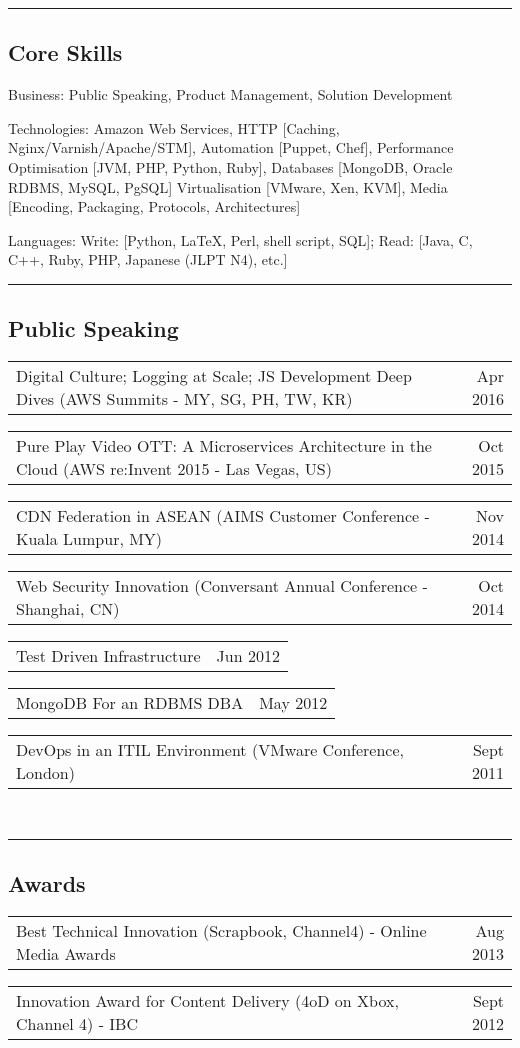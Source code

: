 \documentclass[10pt,a4paper]{article}
\makeatletter
\newenvironment{indentsection}[1]%
{\begin{list}{}%
    {\setlength{\leftmargin}{#1}}%
    \item[]%
}
{\end{list}}
\newcommand{\headerrow}[2]
{\begin{tabular*}{\linewidth}{l@{\extracolsep{\fill}}r}
    #1 &
    #2 \\
\end{tabular*}}
\makeatother
\begin{document}
\hrule
\vspace{-0.4em}
\subsection*{Core Skills}

\begin{indentsection}{\parindent}
\begin{description*}
    \item[Business:]
    Public Speaking, Product Management, Solution Development 
    \item[Technologies:]
    Amazon Web Services, HTTP [Caching, Nginx/Varnish/Apache/STM], Automation [Puppet, Chef], Performance Optimisation [JVM, PHP, Python, Ruby], Databases [MongoDB, Oracle RDBMS, MySQL, PgSQL] Virtualisation [VMware, Xen, KVM], Media [Encoding, Packaging, Protocols, Architectures]
    \item[Languages:]
    Write: [Python, \LaTeX, Perl, shell script, SQL]; Read: [Java, C, C++, Ruby, PHP, Japanese (JLPT N4), etc.]
\end{description*}
\end{indentsection}

\hrule
\vspace{-0.4em}
\subsection*{Public Speaking}
    \headerrow
        {Digital Culture; Logging at Scale; JS Development Deep Dives (AWS Summits - MY, SG, PH, TW, KR)}
        {Apr 2016}
    \headerrow
        {Pure Play Video OTT: A Microservices Architecture in the Cloud (AWS re:Invent 2015 - Las Vegas, US)}
        {Oct 2015}
    \headerrow
        {CDN Federation in ASEAN (AIMS Customer Conference - Kuala Lumpur, MY)}
        {Nov 2014}
    \headerrow
        {Web Security Innovation (Conversant Annual Conference - Shanghai, CN)}
        {Oct 2014}
    \headerrow
        {Test Driven Infrastructure}
        {Jun 2012}
    \headerrow
        {MongoDB For an RDBMS DBA}
        {May 2012}
    \headerrow
        {DevOps in an ITIL Environment (VMware Conference, London)}
        {Sept 2011}
\\
\hrule
\vspace{-0.4em}
\subsection*{Awards}
    \headerrow
        {Best Technical Innovation (Scrapbook, Channel4) - Online Media Awards}
        {Aug 2013}
    \headerrow
        {Innovation Award for Content Delivery (4oD on Xbox, Channel 4) - IBC}
        {Sept 2012}
\end{document}
